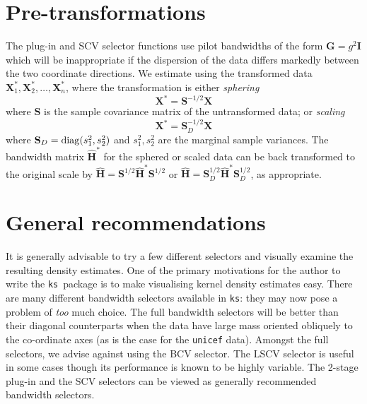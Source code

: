 \documentclass[a4paper,11pt]{article}
\renewcommand{\vec}[1]{\boldsymbol{#1}}
\newcommand{\mat}[1]{\mathbf{#1}}
\def\HH{\mat{H}}
\def\ks{\texttt{ks}}
\begin{document}

\section{Pre-transformations}
\label{sec:pre}
The plug-in and SCV selector functions use pilot bandwidths of the 
form $\mat{G} = g^2 \mat{I}$ which will be 
inappropriate if the dispersion of the data differs 
markedly between the two coordinate 
directions. We estimate using the transformed data 
$\vec{X}_1^*, \vec{X}_2^*, 
\dots, \vec{X}_n^*$, where the transformation is either {\em sphering} 
$$\vec{X}^*= \mat{S}^{-1/2} \vec{X}$$
where $\mat{S}$ is the sample covariance matrix of the untransformed data; 
or {\em scaling}
$$\vec{X}^*= \mat{S}_D^{-1/2} \vec{X}$$
where $\mat{S}_D = {\rm diag}(s_{1}^2, s_{2}^2)$ and $s_1^2, s_2^2$ are 
the marginal sample variances. The  
bandwidth matrix $\hat{\HH}^*$
for the sphered or scaled data can be back transformed to the original scale by 
$\hat{\HH} = \mat{S}^{1/2} \hat{\HH}^* \mat{S}^{1/2}$ or 
$\hat{\HH} = 
\mat{S}_D^{1/2} \hat{\HH}^* \mat{S}_D^{1/2}$, as appropriate.


\section{General recommendations}

It is generally advisable to try a few 
different selectors and visually examine the resulting density estimates. 
One of the primary motivations for the author to write the \ks \ package 
is to make visualising kernel density estimates easy.
There are many different bandwidth selectors available in \ks: they may
now pose a problem of \emph{too} much choice.
The full bandwidth selectors will be better than their diagonal counterparts
when the data have large mass oriented obliquely to the co-ordinate axes 
(as is the case for the \texttt{unicef} data). 
Amongst the full selectors, we advise against using the BCV selector. 
The LSCV selector is useful in some cases though its performance is 
known to be highly variable. The 2-stage plug-in and the SCV selectors
can be viewed as generally recommended bandwidth selectors.



%
\end{document}

